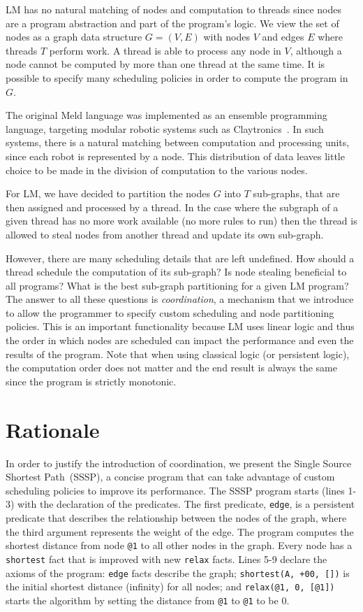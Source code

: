LM has no natural matching of nodes and computation to threads since nodes are a
program abstraction and part of the program's logic. We view the set of nodes as
a graph data structure $G = (V, E)$ with nodes $V$ and edges $E$ where threads
$T$ perform work. A thread is able to process any node in $V$, although a node
cannot be computed by more than one thread at the same time. It is possible to
specify many scheduling policies in order to compute the program in $G$.

The original Meld language was implemented as an ensemble programming language,
targeting modular robotic systems such as
Claytronics~\cite{ashley-rollman-derosa-iros07wksp}. In such systems, there is a
natural matching between computation and processing units, since each robot is
represented by a node. This distribution of data leaves little choice to be made
in the division of computation to the various nodes.

For LM, we have decided to partition the nodes $G$ into $T$ sub-graphs, that
are then assigned and processed by a thread. In the case where the subgraph of a
given thread has no more work available (no more rules to run) then the thread
is allowed to steal nodes from another thread and update its own sub-graph.

However, there are many scheduling details that are left undefined. How should a
thread schedule the computation of its sub-graph? Is node stealing beneficial to
all programs? What is the best sub-graph partitioning for a given LM program?
The answer to all these questions is \emph{coordination}, a mechanism that we
introduce to allow the programmer to specify custom scheduling and node
partitioning policies. This is an important functionality because LM uses linear
logic and thus the order in which nodes are scheduled can impact the performance
and even the results of the program. Note that when using classical logic (or
persistent logic), the computation order does not matter and the end result is
always the same since the program is strictly monotonic.

\section{Rationale}

In order to justify the introduction of coordination, we present the Single
Source Shortest Path~(SSSP), a concise program that can take advantage of custom
scheduling policies to improve its performance. The SSSP program starts (lines
1-3) with the declaration of the predicates. The first predicate, \texttt{edge},
is a persistent predicate that describes the relationship between the nodes of
the graph, where the third argument represents the weight of the edge.  The
program computes the shortest distance from node \texttt{@1} to all other nodes
in the graph. Every node has a \texttt{shortest} fact that is improved with new
\texttt{relax} facts.  Lines 5-9 declare the axioms of the program:
\texttt{edge} facts describe the graph; \texttt{shortest(A, +00, [])} is the
initial shortest distance (infinity) for all nodes; and \texttt{relax(@1, 0,
   [@1])} starts the algorithm by setting the distance from \texttt{@1} to
\texttt{@1} to be 0.

